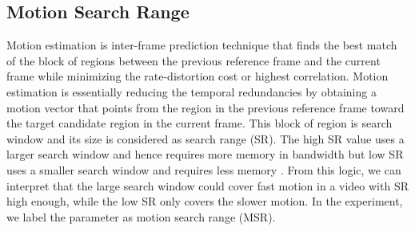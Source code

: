 \subsection{Motion Search Range}
\label{subsec:background/section_c/msr}
Motion estimation is inter-frame prediction technique that finds the best match of the block of regions between the previous reference frame and the current frame while minimizing the rate-distortion cost or highest correlation. Motion estimation is essentially reducing the temporal redundancies by obtaining a motion vector that points from the region in the previous reference frame toward the target candidate region in the current frame. This block of region is search window and its size is considered as search range (SR). The high SR value uses a larger search window and hence requires more memory in bandwidth but low SR uses a smaller search window and requires less memory  \cite{lou_adaptive_2010} \cite{bachu_review_2015}. From this logic, we can interpret that the large search window could cover fast motion in a video with SR high enough, while the low SR only covers the slower motion. In the experiment, we label the parameter as motion search range (MSR).


